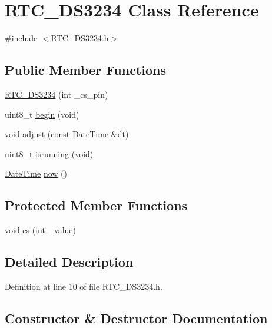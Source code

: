 \hypertarget{class_r_t_c___d_s3234}{}\section{R\+T\+C\+\_\+\+D\+S3234 Class Reference}
\label{class_r_t_c___d_s3234}


{\ttfamily \#include $<$R\+T\+C\+\_\+\+D\+S3234.\+h$>$}

\subsection*{Public Member Functions}
\begin{DoxyCompactItemize}
\item 
\hyperlink{class_r_t_c___d_s3234_a28e48a48c9b04692e5c5049e94e389f1}{R\+T\+C\+\_\+\+D\+S3234} (int \+\_\+cs\+\_\+pin)
\item 
uint8\+\_\+t \hyperlink{class_r_t_c___d_s3234_acf87a4369cb5b08fd1be62696a6be1a8}{begin} (void)
\item 
void \hyperlink{class_r_t_c___d_s3234_a13766581ca199cae55d02327c39f78da}{adjust} (const \hyperlink{class_date_time}{Date\+Time} \&dt)
\item 
uint8\+\_\+t \hyperlink{class_r_t_c___d_s3234_aff58814e7f5706f341edbf9d68c4665b}{isrunning} (void)
\item 
\hyperlink{class_date_time}{Date\+Time} \hyperlink{class_r_t_c___d_s3234_a1b22090fcfdbef26725da0232157a3c1}{now} ()
\end{DoxyCompactItemize}
\subsection*{Protected Member Functions}
\begin{DoxyCompactItemize}
\item 
void \hyperlink{class_r_t_c___d_s3234_a4c3b3cf6e91e926d0d038b8d60a99334}{cs} (int \+\_\+value)
\end{DoxyCompactItemize}


\subsection{Detailed Description}


Definition at line 10 of file R\+T\+C\+\_\+\+D\+S3234.\+h.



\subsection{Constructor \& Destructor Documentation}
